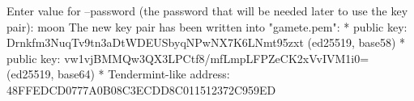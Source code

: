 \begin{shellbox}\begin{ttlst}
Enter value for --password (the password that will be needed later to use the key pair): moon
The new key pair has been written into "gamete.pem":
* public key: Drnkfm3NuqTv9tn3aDtWDEUSbyqNPwNX7K6LNmt95zxt (ed25519, base58)
* public key: vw1vjBMMQw3QX3LPCtf8/mfLmpLFPZeCK2xVvIVM1i0= (ed25519, base64)
* Tendermint-like address: 48FFEDCD0777A0B08C3ECDD8C011512372C959ED
\end{ttlst}\end{shellbox}
